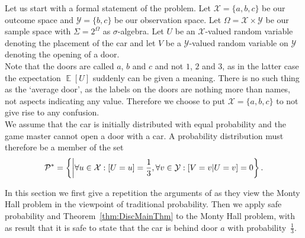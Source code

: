 \documentclass[a4paper]{report}
\theoremstyle{plain}
\theoremstyle{definition}
\theoremstyle{remark}
\numberwithin{equation}{chapter}
\let\P\relax
\DeclareMathOperator{\P}{\mathbb{P}}
\DeclareMathOperator{\E}{\mathbb{E}}
\DeclareMathOperator{\1}{\mathbbm{1}}
\newcommand{\X}{\mathcal{X}}
\newcommand{\Y}{\mathcal{Y}}
\newcommand{\Pmod}{\mathcal{P}^*}
\begin{document}
Let us start with a formal statement of the problem. Let $\X=\{a,b,c\}$ be our outcome space and $\Y=\{b,c\}$ be our observation space. Let $\Omega=\X\times\Y$ be our sample space with $\Sigma=2^\Omega$ as $\sigma$-algebra. Let $U$ be an $\X$-valued random variable denoting the placement of the car and let $V$ be a $\Y$-valued random variable on $\Y$ denoting the opening of a door.\\
Note that the doors are called $a$, $b$ and $c$ and not $1$, $2$ and $3$, as in the latter case the expectation $\E[U]$ suddenly can be given a meaning. There is no such thing as the `average door', as the labels on the doors are nothing more than names, not aspects indicating any value. Therefore we choose to put $\X=\{a,b,c\}$ to not give rise to any confusion.\\
We assume that the car is initially distributed with equal probability and the game master cannot open a door with a car. A probability distribution must therefore be a member of the set
\begin{equation}
\Pmod=\left\{\P\middle|\forall u\in\X:\P[U=u]=\frac{1}{3},\forall v\in\Y:\P[V=v|U=v]=0\right\}.
\end{equation}

In this section we first give a repetition the arguments of \cite{Grunwald13} as they view the Monty Hall problem in the viewpoint of traditional probability. Then we apply safe probability and Theorem~\ref{thm:DiscMainThm} to the Monty Hall problem, with as result that it is safe to state that the car is behind door $a$ with probability~$\frac{1}{3}$.
\end{document}
